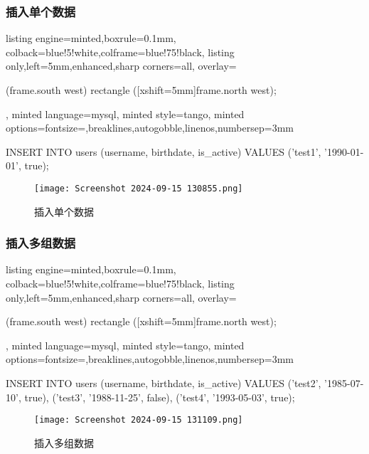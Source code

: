\documentclass[12pt]{article}
\begin{document}
\subsubsection{插入单个数据}
\begin{tcblisting}{listing engine=minted,boxrule=0.1mm,
colback=blue!5!white,colframe=blue!75!black,
listing only,left=5mm,enhanced,sharp corners=all,
overlay={\begin{tcbclipinterior} (frame.south west)
rectangle ([xshift=5mm]frame.north west);\end{tcbclipinterior}},
minted language=mysql,
minted style=tango,
minted options={fontsize=\small,breaklines,autogobble,linenos,numbersep=3mm}}
INSERT INTO users (username,  birthdate, is_active)
VALUES ('test1', '1990-01-01', true);
\end{tcblisting}
\begin{figure}[htbp]
    \centering
    \texttt{[image: Screenshot 2024-09-15 130855.png]}
    \caption{插入单个数据}
    \label{fig:enter-label}
\end{figure}
\subsubsection{插入多组数据}
\begin{tcblisting}{listing engine=minted,boxrule=0.1mm,
colback=blue!5!white,colframe=blue!75!black,
listing only,left=5mm,enhanced,sharp corners=all,
overlay={\begin{tcbclipinterior} (frame.south west)
rectangle ([xshift=5mm]frame.north west);\end{tcbclipinterior}},
minted language=mysql,
minted style=tango,
minted options={fontsize=\small,breaklines,autogobble,linenos,numbersep=3mm}}
INSERT INTO users (username,  birthdate, is_active)
VALUES
    ('test2',  '1985-07-10', true),
    ('test3',  '1988-11-25', false),
    ('test4',  '1993-05-03', true);
\end{tcblisting}
\begin{figure}[htbp]
    \centering
    \texttt{[image: Screenshot 2024-09-15 131109.png]}
    \caption{插入多组数据}
    \label{fig:enter-label}
\end{figure}
\end{document}
